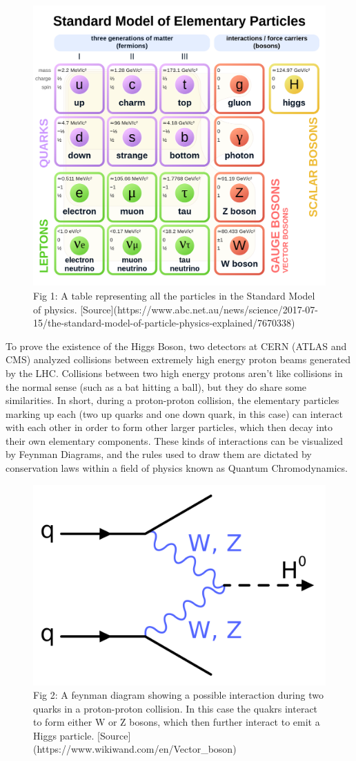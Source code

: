 \documentclass[
]{article}
\begin{document}
\begin{figure}

{\centering \includegraphics[width=0.6\linewidth]{Figures/StandardModel} 

}

\caption{Fig 1: A table representing all the particles in the Standard Model of physics. [Source](https://www.abc.net.au/news/science/2017-07-15/the-standard-model-of-particle-physics-explained/7670338)}\label{fig:Fig1}
\end{figure}

To prove the existence of the Higgs Boson, two detectors at CERN (ATLAS
and CMS) analyzed collisions between extremely high energy proton beams
generated by the LHC. Collisions between two high energy protons aren't
like collisions in the normal sense (such as a bat hitting a ball), but
they do share some similarities. In short, during a proton-proton
collision, the elementary particles marking up each (two up quarks and
one down quark, in this case) can interact with each other in order to
form other larger particles, which then decay into their own elementary
components. These kinds of interactions can be visualized by Feynman
Diagrams, and the rules used to draw them are dictated by conservation
laws within a field of physics known as Quantum Chromodynamics.

\begin{figure}

{\centering \includegraphics[width=0.6\linewidth]{Figures/Higgs_Feynman_Diagram} 

}

\caption{Fig 2: A feynman diagram showing a possible interaction during two quarks in a proton-proton collision. In this case the quakrs interact to form either W or Z bosons, which then further interact to emit a Higgs particle. [Source](https://www.wikiwand.com/en/Vector_boson)}\label{fig:Fig2}
\end{figure}
\end{document}
